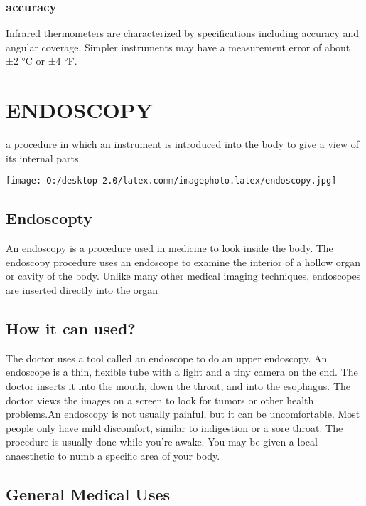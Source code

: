 \documentclass[12pt]{article}
\begin{document}
\subsubsection{accuracy}


Infrared thermometers are characterized by specifications including accuracy and angular coverage. Simpler instruments may have a measurement error of about ±2 °C or ±4 °F.



\section{ENDOSCOPY} 


a procedure in which an instrument is introduced into the body to give a view of its internal parts.


\texttt{[image: O:/desktop 2.0/latex.comm/imagephoto.latex/endoscopy.jpg]} 




\subsection{Endoscopty}

An endoscopy  is a procedure used in medicine to look inside the body. The endoscopy procedure uses an endoscope to examine the interior of a hollow organ or cavity of the body. Unlike many other medical imaging techniques, endoscopes are inserted directly into the organ


\subsection{How it can used?}

The doctor uses a tool called an endoscope to do an upper endoscopy. An endoscope is a thin, flexible tube with a light and a tiny camera on the end. The doctor inserts it into the mouth, down the throat, and into the esophagus. The doctor views the images on a screen to look for tumors or other health problems.An endoscopy is not usually painful, but it can be uncomfortable. Most people only have mild discomfort, similar to indigestion or a sore throat. The procedure is usually done while you're awake. You may be given a local anaesthetic to numb a specific area of your body.



\subsection{General Medical Uses }
\end{document}
